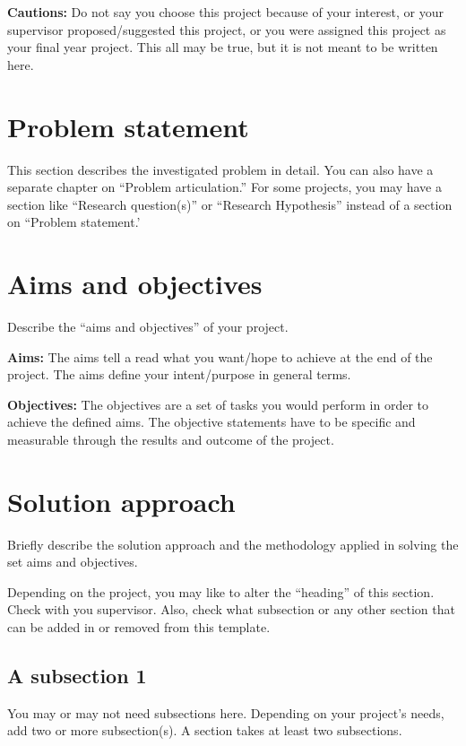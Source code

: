 \textbf{Cautions:} Do not say you choose this project because of your interest, or your supervisor proposed/suggested this project, or you were assigned this project as your final year project. This all may be true, but it is not meant to be written here.

\section{Problem statement}
\label{sec:intro_prob_art}
This section describes the investigated problem in detail. You can also have a separate chapter on ``Problem articulation.''  For some projects, you may have a section like ``Research question(s)'' or ``Research Hypothesis'' instead of a section on ``Problem statement.'

\section{Aims and objectives}
\label{sec:intro_aims_obj}
Describe the ``aims and objectives'' of your project. 

\textbf{Aims:} The aims tell a read what you want/hope to achieve at the end of the project. The  aims define your intent/purpose in general terms.  

\textbf{Objectives:} The objectives are a set of tasks you would perform in order to achieve the defined aims. The objective statements have to be specific and measurable through the results and outcome of the project.



\section{Solution approach}
\label{sec:intro_sol} %
Briefly describe the solution approach and the methodology applied in solving the set aims and objectives.

Depending on the project, you may like to alter the ``heading'' of this section. Check with you supervisor. Also, check what subsection or any other section that can be added in or removed from this template.

\subsection{A subsection 1}
\label{sec:intro_some_sub1}
You may or may not need subsections here. Depending on your project's needs, add two or more subsection(s). A section takes at least two subsections. 


